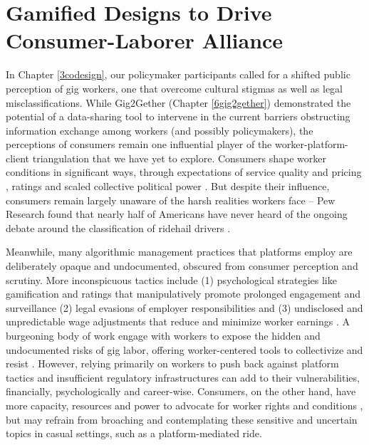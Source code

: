 \chapter{Gamified Designs to Drive Consumer-Laborer Alliance}\label{proposal} 

In Chapter \ref{3codesign}, our policymaker participants called for a shifted public perception of gig workers, one that overcome cultural stigmas as well as legal misclassifications.
While Gig2Gether (Chapter \ref{6gig2gether}) demonstrated the potential of a data-sharing tool to intervene in the current barriers obstructing information exchange among workers (and possibly policymakers), the perceptions of consumers remain one influential player of the worker-platform-client triangulation that we have yet to explore. Consumers shape worker conditions in significant ways, through expectations of service quality and pricing \cite{influence}, ratings \cite{homecare} and scaled collective political power \cite{triangle}.
But despite their influence, consumers remain largely unaware of the harsh realities workers face -- Pew Research found that nearly half of Americans have never heard of the ongoing debate around the classification of ridehail drivers \cite{pew}.

Meanwhile, many algorithmic management practices that platforms employ are deliberately opaque and undocumented, obscured from consumer perception and scrutiny. More inconspicuous tactics include (1) psychological strategies like gamification and ratings that manipulatively promote prolonged engagement and surveillance \cite{rating, long_hours, making_out} (2) legal evasions of employer responsibilities and (3) undisclosed and unpredictable wage adjustments that reduce and minimize worker earnings \cite{vasudevangame}. 
A burgeoning body of work engage with workers to expose the hidden and undocumented risks of gig labor, offering worker-centered tools to collectivize and resist \cite{gig2gether, zhang2023stakeholder, homecare}. However, relying primarily on workers to push back against platform tactics and insufficient regulatory infrastructures can add to their vulnerabilities, financially, psychologically and career-wise. Consumers, on the other hand, have more capacity, resources and power to advocate for worker rights and conditions \cite{fastdrink}, but may refrain from broaching and contemplating these sensitive and uncertain topics in casual settings, such as a platform-mediated ride. 

